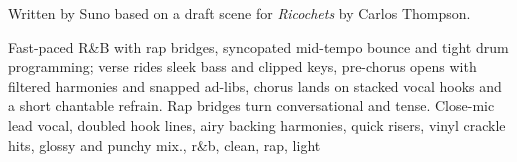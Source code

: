 

\begin{notes}
Written by Suno based on a draft scene for \emph{Ricochets} by Carlos Thompson.
\end{notes}

\begin{style}
Fast-paced R\&B with rap bridges, syncopated mid-tempo bounce and tight drum programming; verse rides sleek bass and clipped keys, pre-chorus opens with filtered harmonies and snapped ad-libs, chorus lands on stacked vocal hooks and a short chantable refrain. %
Rap bridges turn conversational and tense. %
Close-mic lead vocal, doubled hook lines, airy backing harmonies, quick risers, vinyl crackle hits, glossy and punchy mix., r\&b, clean, rap, light
\end{style}

